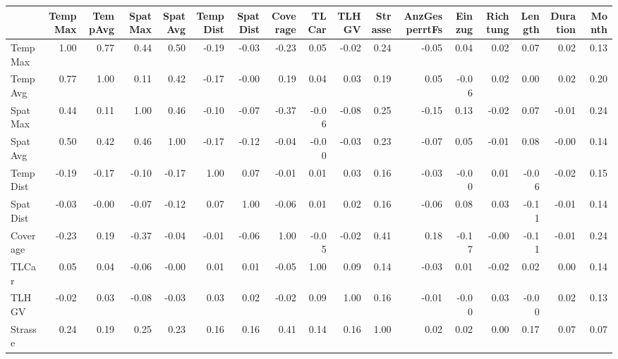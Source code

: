 \begin{tabular}{lrrrrrrrrrrrrrrrr}
\toprule
{} &  TempMax &  TempAvg &  SpatMax &  SpatAvg &  TempDist &  SpatDist &  Coverage &  TLCar &  TLHGV &  Strasse &  AnzGesperrtFs &  Einzug &  Richtung &  Length &  Duration &  Month \\
\midrule
TempMax       &     1.00 &     0.77 &     0.44 &     0.50 &     -0.19 &     -0.03 &     -0.23 &   0.05 &  -0.02 &     0.24 &          -0.05 &    0.04 &      0.02 &    0.07 &      0.02 &   0.13 \\
TempAvg       &     0.77 &     1.00 &     0.11 &     0.42 &     -0.17 &     -0.00 &      0.19 &   0.04 &   0.03 &     0.19 &           0.05 &   -0.06 &      0.02 &    0.00 &      0.02 &   0.20 \\
SpatMax       &     0.44 &     0.11 &     1.00 &     0.46 &     -0.10 &     -0.07 &     -0.37 &  -0.06 &  -0.08 &     0.25 &          -0.15 &    0.13 &     -0.02 &    0.07 &     -0.01 &   0.24 \\
SpatAvg       &     0.50 &     0.42 &     0.46 &     1.00 &     -0.17 &     -0.12 &     -0.04 &  -0.00 &  -0.03 &     0.23 &          -0.07 &    0.05 &     -0.01 &    0.08 &     -0.00 &   0.14 \\
TempDist      &    -0.19 &    -0.17 &    -0.10 &    -0.17 &      1.00 &      0.07 &     -0.01 &   0.01 &   0.03 &     0.16 &          -0.03 &   -0.00 &      0.01 &   -0.06 &     -0.02 &   0.15 \\
SpatDist      &    -0.03 &    -0.00 &    -0.07 &    -0.12 &      0.07 &      1.00 &     -0.06 &   0.01 &   0.02 &     0.16 &          -0.06 &    0.08 &      0.03 &   -0.11 &     -0.01 &   0.14 \\
Coverage      &    -0.23 &     0.19 &    -0.37 &    -0.04 &     -0.01 &     -0.06 &      1.00 &  -0.05 &  -0.02 &     0.41 &           0.18 &   -0.17 &     -0.00 &   -0.11 &     -0.01 &   0.24 \\
TLCar         &     0.05 &     0.04 &    -0.06 &    -0.00 &      0.01 &      0.01 &     -0.05 &   1.00 &   0.09 &     0.14 &          -0.03 &    0.01 &     -0.02 &    0.02 &      0.00 &   0.14 \\
TLHGV         &    -0.02 &     0.03 &    -0.08 &    -0.03 &      0.03 &      0.02 &     -0.02 &   0.09 &   1.00 &     0.16 &          -0.01 &   -0.00 &      0.03 &   -0.00 &      0.02 &   0.13 \\
Strasse       &     0.24 &     0.19 &     0.25 &     0.23 &      0.16 &      0.16 &      0.41 &   0.14 &   0.16 &     1.00 &           0.02 &    0.02 &      0.00 &    0.17 &      0.07 &   0.07 \\

\end{tabular}
